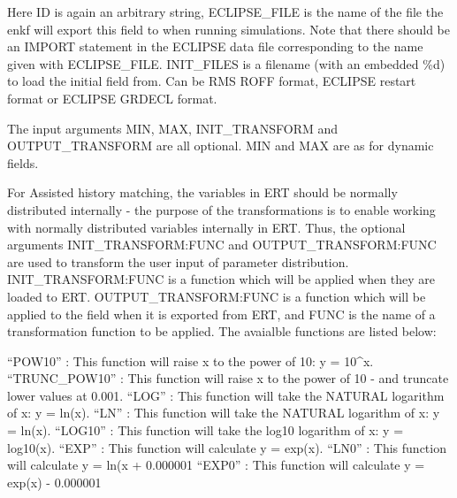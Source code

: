\documentclass[letterpaper,10pt,english]{sphinxmanual}
\begin{document}
\begin{sphinxShadowBox}
%
\begin{sphinxVerbatim}[commandchars=\\\{\}]
             
\end{sphinxVerbatim}

Here ID is again an arbitrary string, ECLIPSE\_FILE is the name of the file the
enkf will export this field to when running simulations. Note that there
should be an IMPORT statement in the ECLIPSE data file corresponding to the
name given with ECLIPSE\_FILE. INIT\_FILES is a filename (with an embedded \%d)
to load the initial field from. Can be RMS ROFF format, ECLIPSE restart format
or ECLIPSE GRDECL format.

The input arguments MIN, MAX, INIT\_TRANSFORM and OUTPUT\_TRANSFORM are all
optional. MIN and MAX are as for dynamic fields.

For Assisted history matching, the variables in ERT should be normally
distributed internally - the purpose of the transformations is to enable
working with normally distributed variables internally in ERT. Thus, the
optional arguments INIT\_TRANSFORM:FUNC and OUTPUT\_TRANSFORM:FUNC are used to
transform the user input of parameter distribution. INIT\_TRANSFORM:FUNC is a
function which will be applied when they are loaded to ERT.
OUTPUT\_TRANSFORM:FUNC is a function which will be applied to the field when it
is exported from ERT, and FUNC is the name of a transformation function to be
applied. The avaialble functions are listed below:

“POW10”       : This function will raise x to the power of 10: y = 10\textasciicircum{}x.
“TRUNC\_POW10” : This function will raise x to the power of 10 - and truncate lower values at 0.001.
“LOG”         : This function will take the NATURAL logarithm of x: y = ln(x).
“LN”          : This function will take the NATURAL logarithm of x: y = ln(x).
“LOG10”       : This function will take the log10 logarithm of x: y = log10(x).
“EXP”         : This function will calculate y = exp(x).
“LN0”         : This function will calculate y = ln(x + 0.000001
“EXP0”        : This function will calculate y = exp(x) - 0.000001


\end{sphinxShadowBox}
\end{document}
